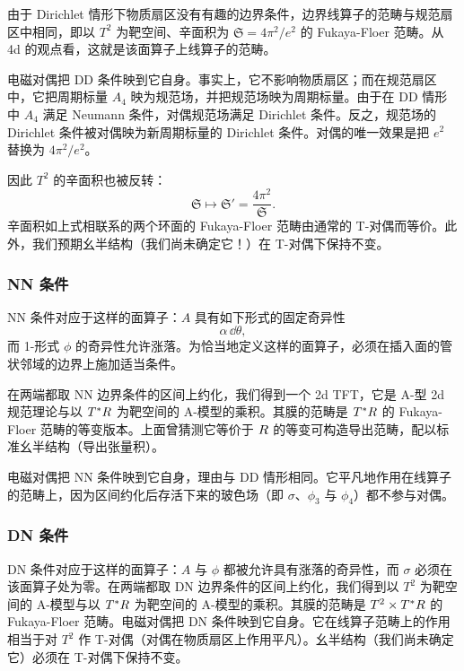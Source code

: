 由于 Dirichlet 情形下物质扇区没有有趣的边界条件，边界线算子的范畴与规范扇区中相同，即以 $T^2$ 为靶空间、辛面积为 $\mathfrak{S}=4\pi^2/e^2$ 的 Fukaya-Floer 范畴。从 4d 的观点看，这就是该面算子上线算子的范畴。

电磁对偶把 DD 条件映到它自身。事实上，它不影响物质扇区；而在规范扇区中，它把周期标量 $A_4$ 映为规范场，并把规范场映为周期标量。由于在 DD 情形中 $A_4$ 满足 Neumann 条件，对偶规范场满足 Dirichlet 条件。反之，规范场的 Dirichlet 条件被对偶映为新周期标量的 Dirichlet 条件。对偶的唯一效果是把 $e^2$ 替换为 $4\pi^2/e^2$。

因此 $T^2$ 的辛面积也被反转：
\[
  \mathfrak{S}\mapsto\mathfrak{S}'=\frac{4\pi^2}{\mathfrak{S}}.
\]
辛面积如上式相联系的两个环面的 Fukaya-Floer 范畴由通常的 T-对偶而等价。此外，我们预期幺半结构（我们尚未确定它！）在 T-对偶下保持不变。


\subsubsection{NN 条件}

NN 条件对应于这样的面算子：$A$ 具有如下形式的固定奇异性
\[
  \alpha\,\dd\theta,
\]
而 1-形式 $\phi$ 的奇异性允许涨落。为恰当地定义这样的面算子，必须在插入面的管状邻域的边界上施加适当条件。

在两端都取 NN 边界条件的区间上约化，我们得到一个 2d TFT，它是 A-型 2d 规范理论与以 $T^*R$ 为靶空间的 A-模型的乘积。其膜的范畴是 $T^*R$ 的 Fukaya-Floer 范畴的等变版本。上面曾猜测它等价于 $R$ 的等变可构造导出范畴，配以标准幺半结构（导出张量积）。

电磁对偶把 NN 条件映到它自身，理由与 DD 情形相同。它平凡地作用在线算子的范畴上，因为区间约化后存活下来的玻色场（即 $\sigma$、$\phi_3$ 与 $\phi_4$）都不参与对偶。

\subsubsection{DN 条件}

DN 条件对应于这样的面算子：$A$ 与 $\phi$ 都被允许具有涨落的奇异性，而 $\sigma$ 必须在该面算子处为零。在两端都取 DN 边界条件的区间上约化，我们得到以 $T^2$ 为靶空间的 A-模型与以 $T^*R$ 为靶空间的 A-模型的乘积。其膜的范畴是 $T^2\times T^*R$ 的 Fukaya-Floer 范畴。电磁对偶把 DN 条件映到它自身。它在线算子范畴上的作用相当于对 $T^2$ 作 T-对偶（对偶在物质扇区上作用平凡）。幺半结构（我们尚未确定它）必须在 T-对偶下保持不变。

